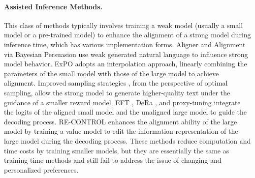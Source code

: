 \vspace{-1.5ex}


\paragraph{\textbf{Assisted Inference Methods.}}
This class of methods typically involves training a weak model (usually a small model or a pre-trained model) to enhance the alignment of a strong model during inference time, which has various implementation forms. 
Aligner \citep{ji2024aligner} and Alignment via Bayesian Persuasion \citep{bai2024efficient} use weak generated natural language to influence strong model behavior.
ExPO \citep{zheng2024weak} adopts an interpolation approach, linearly combining the parameters of the small model with those of the large model to achieve alignment. Improved sampling strategies \citep{wu2024empirical, snell2024scaling, liu2025can}, from the perspective of optimal sampling, allow the strong model to generate higher-quality text under the guidance of a smaller reward model.
EFT \citep{mitchell2023emulator}, DeRa \citep{liu2024decoding}, and proxy-tuning \citep{liu2024tuning} integrate the logits of the aligned small model and the unaligned large model to guide the decoding process. RE-CONTROL \citep{kong2024aligning} enhances the alignment ability of the large model by training a value model to edit the information representation of the large model during the decoding process.
These methods reduce computation and time costs by training smaller models, but they are essentially the same as training-time methods and still fail to address the issue of changing and personalized preferences.

\vspace{-1.5ex}

